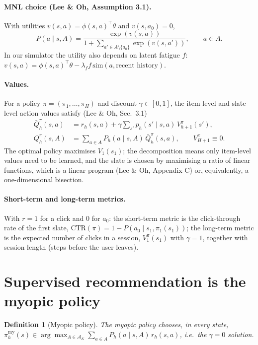 \documentclass[11pt]{article}
\newtheorem{definition}{Definition}
\theoremstyle{remark}
\newcommand{\Aset}{\mathcal{A}}
\begin{document}
\paragraph{MNL choice (Lee \& Oh, Assumption 3.1).} With utilities $v(s,a) = \phi(s,a)^\top \theta$ and
$v(s, a_0) = 0$,
\begin{equation}
P(a \mid s, A) = \frac{\exp(v(s,a))}{1 + \sum_{a' \in A \setminus \{a_0\}} \exp(v(s,a'))}, \qquad a \in A.
\end{equation}
In our simulator the utility also depends on latent fatigue $f$:
$v(s,a) = \phi(s,a)^\top\theta - \lambda_f f \, \mathrm{sim}(a, \text{recent history})$.

\paragraph{Values.} For a policy $\pi = (\pi_1, \dots, \pi_H)$ and discount $\gamma \in [0,1]$,
the item-level and slate-level action values satisfy (Lee \& Oh, Sec.~3.1)
\begin{align}
\bar Q^\pi_h(s, a) &= r_h(s,a) + \gamma \sum_{s'} p_h(s' \mid s, a)\, V^\pi_{h+1}(s'), \\
Q^\pi_h(s, A) &= \sum_{a \in A} P_h(a \mid s, A)\, \bar Q^\pi_h(s, a), \qquad V^\pi_{H+1} \equiv 0.
\end{align}
The optimal policy maximises $V_1(s_1)$; the decomposition means only item-level values need to be learned,
and the slate is chosen by maximising a ratio of linear functions, which is a linear program
(Lee \& Oh, Appendix C) or, equivalently, a one-dimensional bisection.

\paragraph{Short-term and long-term metrics.} With $r = 1$ for a click and $0$ for $a_0$:
the short-term metric is the click-through rate of the first slate, $\mathrm{CTR}(\pi) = 1 - P(a_0 \mid s_1, \pi_1(s_1))$;
the long-term metric is the expected number of clicks in a session, $V^\pi_1(s_1)$ with $\gamma = 1$, together with
session length (steps before the user leaves).

\section{Supervised recommendation is the myopic policy}

\begin{definition}[Myopic policy]
The myopic policy chooses, in every state, $\pi^{\mathrm{my}}_h(s) \in \arg\max_{A \in \Aset_K}
\sum_{a \in A} P_h(a \mid s, A)\, r_h(s, a)$, i.e.\ the $\gamma = 0$ solution.
\end{definition}
\end{document}
